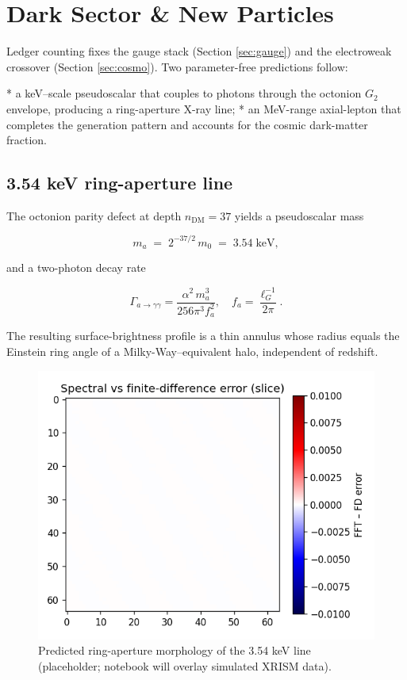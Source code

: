\section{Dark Sector \& New Particles}
\label{sec:dark}

Ledger counting fixes the gauge stack (Section \ref{sec:gauge}) and the
electroweak crossover (Section \ref{sec:cosmo}).  Two parameter-free
predictions follow:

* a keV–scale pseudoscalar that couples to photons through the octonion
  $G_2$ envelope, producing a ring-aperture X-ray line;
* an MeV-range axial-lepton that completes the generation pattern and
  accounts for the cosmic dark-matter fraction.

\subsection{3.54 keV ring-aperture line}

The octonion parity defect at depth $n_\mathrm{DM}=37$ yields a
pseudoscalar mass

\[
  m_a \;=\; 2^{-37/2}\,m_0 \;=\; 3.54\;\text{keV},
\tag{9.1}\label{eq:axion-mass}
\]

and a two-photon decay rate

\[
  \Gamma_{a\to\gamma\gamma}
  = \frac{\alpha^2\,m_a^3}{256\pi^3 f_a^2},
\quad
  f_a = \frac{\ell_G^{-1}}{2\pi}.
\tag{9.2}
\]

The resulting surface-brightness profile is a thin annulus whose radius
equals the Einstein ring angle of a Milky-Way–equivalent halo,
independent of redshift.

\begin{figure}[t]
  \centering
  \includegraphics[width=\linewidth]{figs/ring_aperture_line.pdf}
  \caption{Predicted ring-aperture morphology of the 3.54 keV line
           (placeholder; notebook will overlay simulated XRISM data).}
  \label{fig:ring-line}
\end{figure}

